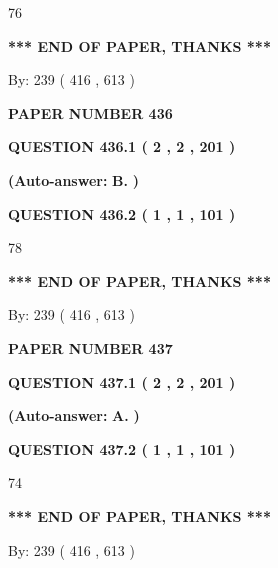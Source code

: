 \documentclass{ctexart}
\begin{document}
76
   
   
   
   
\vspace{1.0in} 
{\textbf{\large{ *** END OF PAPER, THANKS *** }}} 
   
   
\hspace{1.0in} By: 
 239 ( 416 ,  613 )
   
   
   
   
\newpage 
\setcounter{page}{ 
   436001 } 
   
   
 {\textbf{ \Large{ PAPER NUMBER  436  }}}
   
   
   
   
  
  
{\textbf{\large{QUESTION
436.1 
 ( 2 , 2 , 201 )
}}}
 
 
{\textbf{(Auto-answer:}}
{\textbf{\large{
B.}}}
{\textbf{)}}
 
 
  
  
{\textbf{\large{QUESTION
436.2 
 ( 1 , 1 , 101 )
}}}

78
   
   
   
   
\vspace{1.0in} 
{\textbf{\large{ *** END OF PAPER, THANKS *** }}} 
   
   
\hspace{1.0in} By: 
 239 ( 416 ,  613 )
   
   
   
   
\newpage 
\setcounter{page}{ 
   437001 } 
   
   
 {\textbf{ \Large{ PAPER NUMBER  437  }}}
   
   
   
   
  
  
{\textbf{\large{QUESTION
437.1 
 ( 2 , 2 , 201 )
}}}
 
 
{\textbf{(Auto-answer:}}
{\textbf{\large{
A.}}}
{\textbf{)}}
 
 
  
  
{\textbf{\large{QUESTION
437.2 
 ( 1 , 1 , 101 )
}}}

74
   
   
   
   
\vspace{1.0in} 
{\textbf{\large{ *** END OF PAPER, THANKS *** }}} 
   
   
\hspace{1.0in} By: 
 239 ( 416 ,  613 )
   
   
   
   
\newpage 
\setcounter{page}{ 
   438001 } 
   
\end{document}
